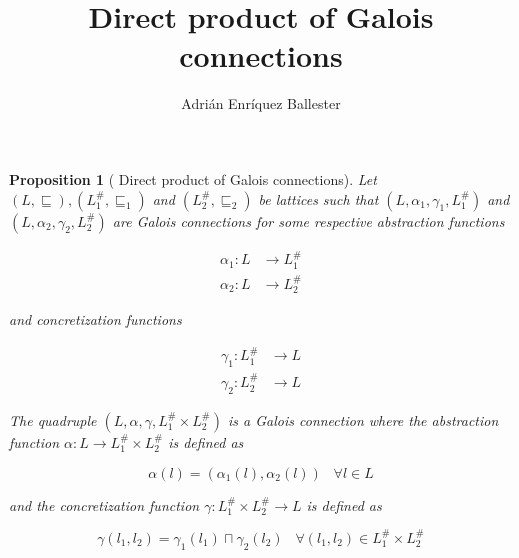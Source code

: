 \documentclass{article}
\title{Direct product of Galois connections}
\author{Adrián Enríquez Ballester}
\newtheorem*{proposition}{Proposition}
\begin{document}
\maketitle

\begin{proposition}[
  Direct product of Galois connections
]
  Let $(L, \sqsubseteq), (L_1^\#, \sqsubseteq_1)$ and 
  $(L_2^\#, \sqsubseteq_2)$ be lattices such that 
  $(L, \alpha_1, \gamma_1, L_1^\#)$ and 
  $(L, \alpha_2, \gamma_2, L_2^\#)$ are Galois 
  connections for some respective abstraction functions 

  \begin{align*}
    \alpha_1: L &\rightarrow L_1^\# \\
    \alpha_2: L &\rightarrow L_2^\#
  \end{align*}

  and concretization functions 

  \begin{align*}
    \gamma_1: L_1^\# &\rightarrow L \\
    \gamma_2: L_2^\# &\rightarrow L
  \end{align*}

  The quadruple $(L, \alpha, \gamma, L_1^\# \times L_2^\#)$
  is a Galois connection where the abstraction function 
  $\alpha: L \rightarrow L_1^\# \times L_2^\#$ is defined as

  $$
    \alpha(l) = (\alpha_1(l), \alpha_2(l)) \;\;\; \forall l \in L
  $$

  and the concretization function 
  $\gamma: L_1^\# \times L_2^\# \rightarrow L$ is defined as

  $$
    \gamma(l_1, l_2) = \gamma_1(l_1) \sqcap \gamma_2(l_2) \;\;\; 
      \forall (l_1, l_2) \in L_1^\# \times L_2^\#
  $$
\end{proposition}
\end{document}
